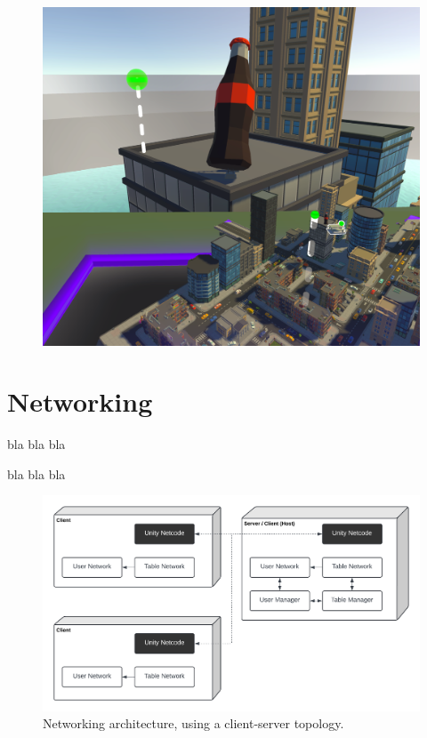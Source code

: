        \begin{figure}[h!]
            \centering
            \includegraphics[width=.8\textwidth]{figures/balloon_world.png}
            \label{fig:balloon_poi}
        \end{figure}
        

    
\section{Networking}

bla bla bla

bla bla bla


    \begin{figure}[h]
        \centering
        \includegraphics[width=1\linewidth]{figures/topology.png}
        \caption{Networking architecture, using a client-server topology.}
        \label{fig:topology}
    \end{figure}

